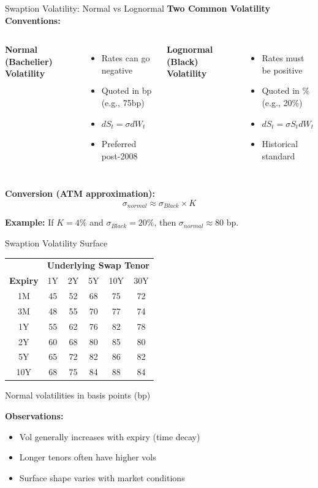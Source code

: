 \documentclass[aspectratio=169,11pt]{beamer}
\begin{document}
\begin{frame}{Swaption Volatility: Normal vs Lognormal}
\textbf{Two Common Volatility Conventions:}

\begin{columns}
\textbf{Normal (Bachelier) Volatility}
\begin{itemize}
    \item Rates can go negative
    \item Quoted in bp (e.g., 75bp)
    \item $dS_t = \sigma dW_t$
    \item Preferred post-2008
\end{itemize}

\textbf{Lognormal (Black) Volatility}
\begin{itemize}
    \item Rates must be positive
    \item Quoted in \% (e.g., 20\%)
    \item $dS_t = \sigma S_t dW_t$
    \item Historical standard
\end{itemize}
\end{columns}

\vspace{0.5cm}
\textbf{Conversion (ATM approximation):}
\[
\sigma_{normal} \approx \sigma_{Black} \times K
\]

\textbf{Example:} If $K = 4\%$ and $\sigma_{Black} = 20\%$, then $\sigma_{normal} \approx 80$ bp.
\end{frame}

\begin{frame}{Swaption Volatility Surface}
\begin{center}
\begin{tabular}{c|ccccc}
\toprule
& \multicolumn{5}{c}{\textbf{Underlying Swap Tenor}} \\
\textbf{Expiry} & 1Y & 2Y & 5Y & 10Y & 30Y \\
\midrule
1M & 45 & 52 & 68 & 75 & 72 \\
3M & 48 & 55 & 70 & 77 & 74 \\
1Y & 55 & 62 & 76 & 82 & 78 \\
2Y & 60 & 68 & 80 & 85 & 80 \\
5Y & 65 & 72 & 82 & 86 & 82 \\
10Y & 68 & 75 & 84 & 88 & 84 \\
\bottomrule
\end{tabular}
\end{center}
\small{Normal volatilities in basis points (bp)}

\vspace{0.3cm}
\textbf{Observations:}
\begin{itemize}
    \item Vol generally increases with expiry (time decay)
    \item Longer tenors often have higher vols
    \item Surface shape varies with market conditions
\end{itemize}
\end{frame}
\end{document}
